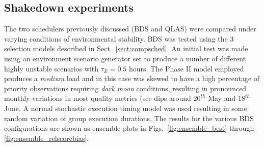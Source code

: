 \subsection{Shakedown experiments}
The two schedulers previously discussed (BDS and QLAS) were compared under varying conditions of environmental stability. BDS was tested using the 3 selection models described in Sect.~\ref{sect:compsched}. An initial test was made using an environment scenario generator set to produce a number of different highly unstable scenarios with $\tau_E = 0.5$ hours. The Phase II model employed produces a \emph{medium} load and in this case was skewed to have a high percentage of priority observations requiring \emph{dark moon} conditions, resulting in pronounced monthly variations in most quality metrics (see dips around $20^{th}$ May and $18^{th}$ June. A normal stochastic execution timing model was used resulting in some random variation of group execution durations. The results for the various BDS configurations are shown as ensemble plots in Figs.~\ref{fig:ensemble_best} through \ref{fig:ensemble_relscorebias}.

